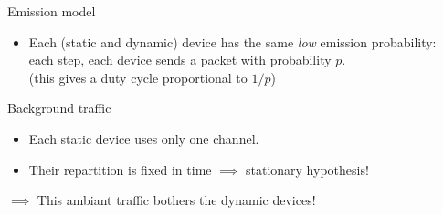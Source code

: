 \begin{frameO}[Hypotheses ($1/2$)]

    \begin{colorblock}{Emission model}

        \begin{itemize}\tightlist
            \item
                  Each (static and dynamic) device has the same \emph{low} emission probability: \\
                  each step, each device sends a packet with probability \(p\).
                  \\
                  \hfill{}\small{(this gives a duty cycle proportional to $1/p$)}
        \end{itemize}

    \end{colorblock}

    \vspace*{20pt}

    \begin{lightblock}{Background traffic}

        \begin{itemize}\tightlist
            \item
                  Each static device uses only one channel.
            \item
                  Their repartition is fixed in time \hfill{} $\implies$ stationary hypothesis!
        \end{itemize}

        \(\implies\) This ambiant traffic bothers the dynamic devices!
    \end{lightblock}

\end{frameO}

